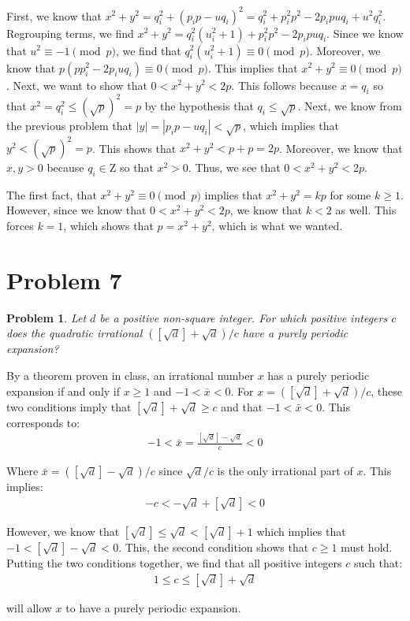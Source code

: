 \documentclass[psamsfonts]{amsart}
\newtheorem{prob}{Problem}[section]
\newenvironment{sol}{{\bfseries Solution}}{\qedsymbol}
\theoremstyle{definition}
\theoremstyle{remark}
\numberwithin{equation}{section}
\begin{document}
\begin{sol}
First, we know that $x^2 + y^2 = q_i^2 + (p_i p - u q_i)^2 = q_i^2 + p_i^2 p^2 - 2 p_i p u q_i + u^2 q_i^2$. Regrouping terms, we find $x^2 + y^2 = q_i^2 ( u_i^2 + 1) + p_i^2 p^2 - 2 p_i p u q_i$. Since we know that $u^2 \equiv -1 \pmod{p}$, we find that $q_i^2 ( u_i^2 + 1) \equiv 0 \pmod{p}$. Moreover, we know that $p ( p p_i^2 - 2 p_i u q_i) \equiv 0 \pmod{p}$. This implies that $x^2 + y^2 \equiv 0 \pmod{p}$. Next, we want to show that $0 < x^2 + y^2 < 2p$. This follows because $x = q_i$ so that $x^2 = q_i^2 \leq (\sqrt{p})^2 = p$ by the hypothesis that $q_i \leq \sqrt{p}$. Next, we know from the previous problem that $|y| = |p_i p - u q_i | < \sqrt{p}$, which implies that $y^2 < (\sqrt{p})^2 = p$. This shows that $x^2 + y^2 < p + p = 2p$. Moreover, we know that $x, y > 0$ because $q_i \in \mathrm{Z}$ so that $x^2 > 0$. Thus, we see that $0 < x^2 + y^2 < 2p$.

The first fact, that $x^2 + y^2 \equiv 0 \pmod{p}$ implies that $x^2 + y^2 = k p$ for some $k \geq 1$. However, since we know that $0 < x^2 + y^2 < 2p$, we know that $k < 2$ as well. This forces $k = 1$, which shows that $ p = x^2 + y^2$, which is what we wanted.
\end{sol}

\section{Problem 7}

\begin{prob}
Let $d$ be a positive non-square integer. For which positive integers $c$ does the quadratic irrational $([ \sqrt{d}] + \sqrt{d})/c$ have a purely periodic expansion?
\end{prob}

\begin{sol}
By a theorem proven in class, an irrational number $x$ has a purely periodic expansion if and only if $x \geq 1$ and $-1 < \bar{x} < 0$. For $x = ([\sqrt{d}] + \sqrt{d}) / c$, these two conditions imply that $[\sqrt{d}] + \sqrt{d} \geq c$ and that $-1 < \bar{x} < 0$. This corresponds to:
\begin{eqnarray}
-1 < \bar{x} = \frac{[\sqrt{d}] - \sqrt{d}}{c} < 0
\end{eqnarray}

Where $\bar{x} = ([\sqrt{d}] - \sqrt{d} )/ c$ since $\sqrt{d}/c$ is the only irrational part of $x$. This implies:
\begin{eqnarray}
-c < - \sqrt{d} + [ \sqrt{d}] < 0
\end{eqnarray}

However, we know that $[\sqrt{d}] \leq \sqrt{d} < [\sqrt{d}] + 1$ which implies that $-1 < [\sqrt{d}] - \sqrt{d} < 0$. This, the second condition shows that $c \geq 1$ must hold. Putting the two conditions together, we find that all positive integers $c$ such that:
\begin{eqnarray}
1 \leq c \leq [\sqrt{d}] + \sqrt{d}
\end{eqnarray}

will allow $x$ to have a purely periodic expansion.
\end{sol}
\end{document}
